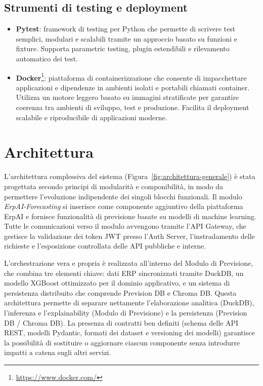 \subsection{Strumenti di testing e deployment}
\begin{itemize}
    \item \textbf{Pytest}: framework di testing per Python che permette di scrivere test semplici, modulari e scalabili tramite un approccio basato su funzioni e fixture. Supporta parametric testing, plugin estendibili e rilevamento automatico dei test.
    \item \textbf{Docker}\footnote{\url{https://www.docker.com/}}: piattaforma di containerizzazione che consente di impacchettare applicazioni e dipendenze in ambienti isolati e portabili chiamati container. Utilizza un motore leggero basato su immagini stratificate per garantire coerenza tra ambienti di sviluppo, test e produzione. Facilita il deployment scalabile e riproducibile di applicazioni moderne.
\end{itemize}

\section{Architettura}
\label{sec:architettura}

L’architettura complessiva del sistema (Figura~\ref{fig:architettura-generale}) è stata progettata secondo principi di modularità e componibilità, in modo da permettere l’evoluzione indipendente dei singoli blocchi funzionali. 
Il modulo \textit{ErpAI-Forecasting} si inserisce come componente aggiuntivo della piattaforma ErpAI e fornisce funzionalità di previsione basate su modelli di machine learning. 
Tutte le comunicazioni verso il modulo avvengono tramite l’API Gateway, che gestisce la validazione dei token JWT presso l’Auth Server, l’instradamento delle richieste e l’esposizione controllata delle API pubbliche e interne.

L’orchestrazione vera e propria è realizzata all’interno del Modulo di Previsione, che combina tre elementi chiave: dati ERP sincronizzati tramite DuckDB, un modello XGBoost ottimizzato per il dominio applicativo, e un sistema di persistenza distribuito che comprende Prevision DB e Chroma DB. 
Questa architettura permette di separare nettamente l’elaborazione analitica (DuckDB), l’inferenza e l’explainability (Modulo di Previsione) e la persistenza (Prevision DB / Chroma DB).  
La presenza di contratti ben definiti (schema delle API REST, modelli Pydantic, formati dei dataset e versioning dei modelli) garantisce la possibilità di sostituire o aggiornare ciascun componente senza introdurre impatti a catena sugli altri servizi.

